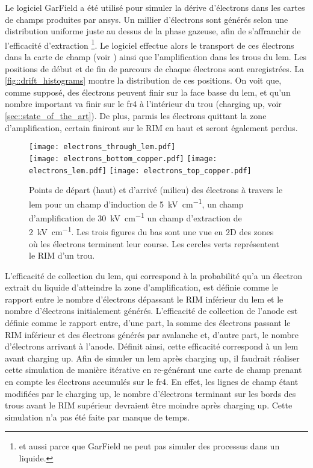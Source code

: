       Le logiciel GarField a été utilisé pour simuler la dérive d'électrons dans les cartes de champs produites par \gls{ansys}. Un millier d'électrons sont générés selon une distribution uniforme juste au dessus de la phase gazeuse, afin de s'affranchir de l'efficacité d'extraction \footnote{et aussi parce que GarField ne peut pas simuler des processus dans un liquide.}. Le logiciel effectue alors le transport de ces électrons dans la carte de champ (voir \cite{garfield}) ainsi que l'amplification dans les trous du \gls{lem}. Les positions de début et de fin de parcours de chaque électrons sont enregistrées. La \autoref{fig::drift_histograms} montre la distribution de ces positions. On voit que, comme supposé, des électrons peuvent finir sur la face basse du \gls{lem}, et qu'un nombre important va finir sur le \gls{fr4} à l'intérieur du trou (charging up, voir \autoref{sec::state_of_the_art}). De plus, parmis les électrons quittant la zone d'amplification, certain finiront sur le RIM en haut et seront également perdus.

      \begin{figure}[htpb]
        \centering
        \texttt{[image: electrons\_through\_lem.pdf]}\\\vspace{0.1cm}
        \texttt{[image: electrons\_bottom\_copper.pdf]}
        \texttt{[image: electrons\_lem.pdf]}
        \texttt{[image: electrons\_top\_copper.pdf]}
        \caption[Point de départ et d'arrivé des électrons à travers le LEM]{\label{fig::drift_histograms}Points de départ (haut) et d'arrivé (milieu) des électrons à travers le \gls{lem} pour un champ d'induction de \SI{5}{\kilo\volt\per\centi\meter}, un champ d'amplification de \SI{30}{\kilo\volt\per\centi\meter} un champ d'extraction de \SI{2}{\kilo\volt\per\centi\meter}. Les trois figures du bas sont une vue en 2D des zones où les électrons terminent leur course. Les cercles verts représentent le RIM d'un trou.}
      \end{figure}
          
      L'efficacité de collection du \gls{lem}, qui correspond à la probabilité qu'a un électron extrait du liquide d'atteindre la zone d'amplification, est définie comme le rapport entre le nombre d'électrons dépassant le RIM inférieur du \gls{lem} et le nombre d'électrons initialement générés. L'efficacité de collection de l'anode est définie comme le rapport entre, d'une part, la somme des électrons passant le RIM inférieur et des électrons générés par avalanche et, d'autre part, le nombre d'électrons arrivant à l'anode. Définit ainsi, cette efficacité correspond à un \gls{lem} avant charging up. Afin de simuler un \gls{lem} après charging up, il faudrait réaliser cette simulation de manière itérative en re-générant une carte de champ prenant en compte les électrons accumulés sur le \gls{fr4}. En effet, les lignes de champ étant modifiées par le charging up, le nombre d'électrons terminant sur les bords des trous avant le RIM supérieur devraient être moindre après charging up. Cette simulation n'a pas été faite par manque de temps.
        
